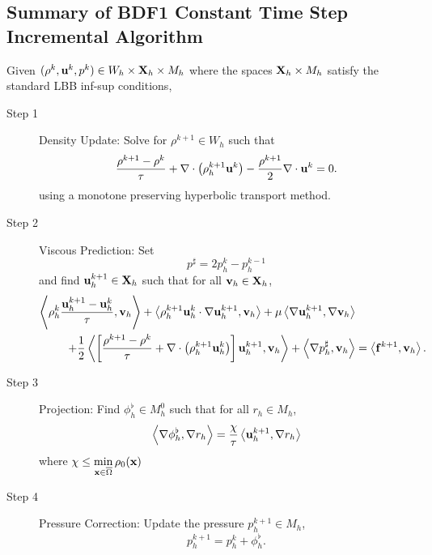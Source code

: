 \documentclass[letterpaper]{erdc}
\begin{document}
%

\subsection{Summary of BDF1 Constant Time Step Incremental Algorithm}\label{subsec:BDF1constantTimeSummary}
Given $(\rho^{k}, \textbf{u}^{k}, p^{k})\in W_h\times \textbf{X}_h\times M_h$ where the spaces $\textbf{X}_h\times M_h$ satisfy the standard LBB inf-sup conditions, 
\begin{description}
  \item[Step 1] Density Update: Solve for $\rho^{k+1}\in W_h$ such that
\begin{equation}
  \frac{\rho^{k+1} - \rho^k}{\tau} + \nabla\cdot\left(\rho_h^{k+1}\textbf{u}^{k} \right) - \frac{\rho^{k+1}}{2}\nabla\cdot\textbf{u}^{k} = 0.
\end{equation}
using a monotone preserving hyperbolic transport method.  

\item[Step 2] Viscous Prediction: Set 
\begin{equation}
  p^{\sharp} = 2p_h^{k} - p_h^{k-1}
\end{equation}
and find $\textbf{u}^{k+1}_h\in\textbf{X}_h$ such that for all $\textbf{v}_h\in\textbf{X}_h$,
\begin{equation}
  \begin{split}
\left\langle  \rho_h^{k}\frac{\textbf{u}_h^{k+1}-\textbf{u}_h^{k} }{\tau} , \textbf{v}_h \right\rangle + \left\langle  \rho_h^{k+1}\textbf{u}_h^{k}\cdot\nabla\textbf{u}_h^{k+1} , \textbf{v}_h \right\rangle + \mu\left\langle  \nabla \textbf{u}_h^{k+1} , \nabla\textbf{v}_h \right\rangle& \\
+ \frac{1}{2}\left\langle \left[\frac{\rho^{k+1}-\rho^{k}}{\tau} + \nabla\cdot\left(\rho_h^{k+1}\textbf{u}_h^{k}\right)\right]\textbf{u}_h^{k+1} , \textbf{v}_h \right\rangle +\left\langle \nabla p_h^{\sharp}, \textbf{v}_h \right\rangle &= \left\langle \mathbf{f}^{k+1}, \textbf{v}_h \right\rangle.
\end{split}
\end{equation}

\item[Step 3] Projection: Find $\phi_h^{\flat}\in M^0_h$ such that for all $r_h\in M_h$,
\begin{equation}
  \left\langle \nabla\phi_h^{\flat}, \nabla r_h \right\rangle = \frac{\chi}{\tau}\left\langle \textbf{u}_h^{k+1}, \nabla r_h \right\rangle
\end{equation}
where $\chi \leq \displaystyle\min_{\textbf{x}\in\overline{\Omega}}\rho_0(\textbf{x})$ 

\item[Step 4] Pressure Correction: Update the pressure $p_h^{k+1}\in M_h$, 
\begin{equation}
p^{k+1}_h = p^{k}_h + \phi^{\flat}_h.
\end{equation}
\end{description}
\end{document}
